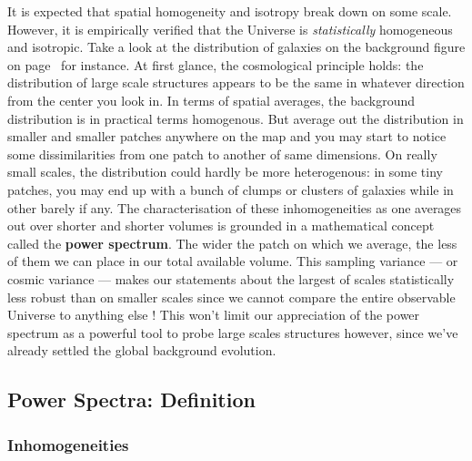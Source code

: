 \vspace*{1.5pc}

It is expected that spatial homogeneity and isotropy break down on some scale. However, it is empirically verified that the Universe is \emph{statistically} homogeneous and isotropic. Take a look at the distribution of galaxies on the background figure on page~\pageref{chap:structure} for instance. At first glance, the cosmological principle holds: the distribution of large scale structures appears to be the same in whatever direction from the center you look in. In terms of spatial averages, the background distribution is in practical terms homogenous. But average out the distribution in smaller and smaller patches anywhere on the map and you may start to notice some dissimilarities from one patch to another of same dimensions. On really small scales, the distribution could hardly be more heterogenous: in some tiny patches, you may end up with a bunch of clumps or clusters of galaxies while in other barely if any. The characterisation of these inhomogeneities as one averages out over shorter and shorter volumes is grounded in a mathematical concept called the \textbf{power spectrum}. The wider the patch on which we average, the less of them we can place in our total available volume. This sampling variance --- or cosmic variance --- makes our statements about the largest of scales statistically less robust than on smaller scales since we cannot compare the entire observable Universe to anything else ! This won't limit our appreciation of the power spectrum as a powerful tool to probe large scales structures however, since we've already settled the global background evolution.

\subsection{Power Spectra: Definition}

\subsubsection{Inhomogeneities}

